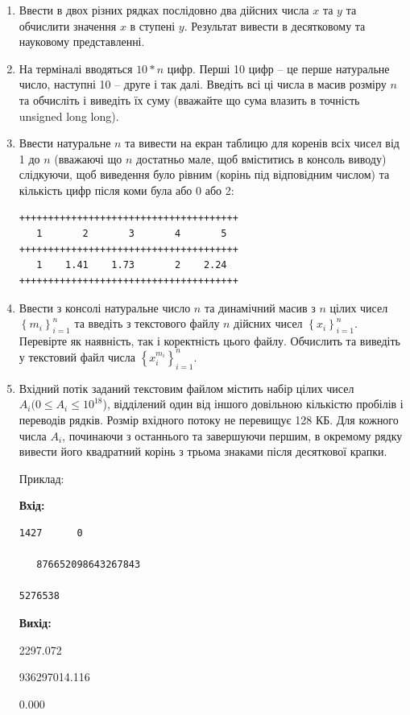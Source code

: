 \documentclass[a5paper,titlepage,openany,twoside,
]
{book_unv}%
\begin{document}
\begin{enumerate}
\begin{enumerate}
\def\labelenumi{\arabic{enumi})}
\item
  Ввести в двох різних рядках послідовно два дійсних числа $x$ та $y$ та
  обчислити значення $x$ в ступені $y$. Результат вивести в десятковому та
  науковому представленні.
\item
  На терміналі вводяться $10*n$ цифр. Перші 10 цифр -- це перше натуральне
  число, наступні 10 -- друге і так далі. Введіть всі ці числа в масив
  розміру $n$ та обчисліть і виведіть їх суму (вважайте що сума влазить в
  точність unsigned long long).
\item
  Ввести натуральне $n$ та вивести на екран таблицю для коренів 
 всіх чисел від 1 до $n$ (вважаючі що $n$ достатньо мале, щоб вміститись в 
 консоль виводу) слідкуючи, щоб виведення було рівним (корінь під відповідним числом)
 та кількість цифр після коми була або 0 або 2:
\begin{verbatim}
++++++++++++++++++++++++++++++++++++++
   1       2       3       4       5 
++++++++++++++++++++++++++++++++++++++
   1    1.41    1.73       2    2.24 
++++++++++++++++++++++++++++++++++++++
\end{verbatim}
\item
  Ввести з консолі натуральне число $n$ та динамічний масив з
  $n$ цілих чисел \(\left\{ m_{i} \right\}_{i = 1}^{n}\) та введіть з 
текстового файлу $n$ дійсних чисел  \(\left\{ x_{i} \right\}_{i = 1}^{n}\).
 Перевірте як наявність, так і коректність цього файлу.
 Обчислить та виведіть у текстовий файл
  числа \(\left\{ x_{i}^{m_{i}} \right\}_{i = 1}^{n}\).
\item
  Вхідний потік заданий текстовим файлом містить набір цілих чисел $A_i (0
  \le A_i \le 10^{18}$), відділений один від іншого довільною кількістю пробілів
  і переводів рядків. Розмір вхідного потоку не перевищує 128 КБ. Для
  кожного числа $A_i$, починаючи з останнього та завершуючи першим, в
  окремому рядку вивести його квадратний корінь з трьома
  знаками після десяткової крапки.

Приклад:

\textbf{Вхід:}
\begin{verbatim}
1427      0

   876652098643267843

5276538
\end{verbatim}
\textbf{Вихід: }

2297.072

936297014.116

0.000


\end{enumerate}
\end{enumerate}
\end{document}
